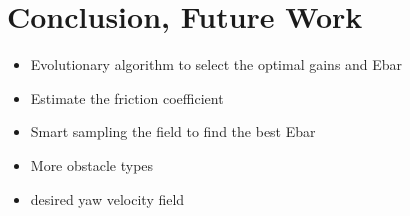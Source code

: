 \section{Conclusion, Future Work}
\begin{itemize}
    \item Evolutionary algorithm to select the optimal gains and Ebar
    \item Estimate the friction coefficient
    \item Smart sampling the field to find the best Ebar
    \item More obstacle types
    \item desired yaw velocity field 
\end{itemize}